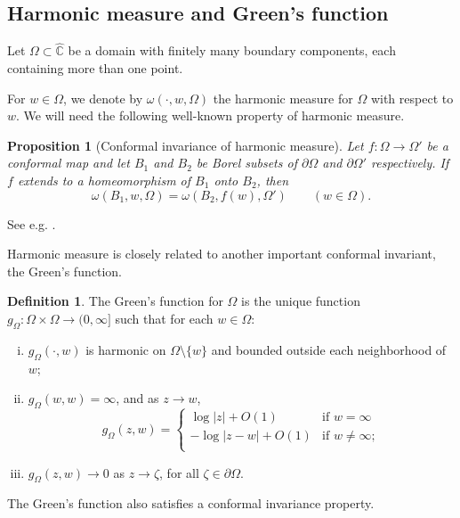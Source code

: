 \documentclass{amsart}
\theoremstyle{plain}
\newtheorem{proposition}[theorem]{Proposition}
\theoremstyle{definition}
\newtheorem{definition}[theorem]{Definition}
\theoremstyle{remark}
\newcommand{\hC}{\widehat{\mathbb{C}}}
\begin{document}
\subsection{Harmonic measure and Green's function}

Let $\Omega \subset \hC$ be a domain with finitely many boundary components, each containing more than one point.

For $w \in \Omega$, we denote by $\omega(\cdot,w,\Omega)$ the harmonic measure for $\Omega$ with respect to $w$. We will need the following well-known property of harmonic measure.

\begin{proposition}[Conformal invariance of harmonic measure]
Let $f:\Omega \to \Omega'$ be a conformal map and let $B_1$ and $B_2$ be Borel subsets of $\partial \Omega$ and $\partial \Omega'$ respectively. If $f$ extends to a homeomorphism of $ B_1$ onto $ B_2$, then
    $$\omega(B_1,w,\Omega) = \omega(B_2,f(w),\Omega') \qquad (w \in \Omega).$$
\end{proposition}
See e.g. \cite[Theorem 4.3.8]{Ransford1995}.

Harmonic measure is closely related to another important conformal invariant, the Green's function.

\begin{definition}
The Green's function for $\Omega$ is the unique function $g_\Omega:\Omega \times \Omega \to (0,\infty]$ such that for each $w \in \Omega$:

\begin{enumerate}[(i)]
\item $g_\Omega(\cdot,w)$ is harmonic on $\Omega \setminus \{w\}$ and bounded outside each neighborhood of $w$;
\item $g_\Omega(w,w)=\infty$, and as $z \to w$,
\begin{displaymath}
g_\Omega(z,w) = \left\{ \begin{array}{ll}
\log{|z|}+O(1) & \textrm{if $w=\infty $}\\
-\log{|z-w|}+O(1) & \textrm{if $w \neq \infty$};\\
\end{array} \right.
\end{displaymath}
\item $g_\Omega(z,w) \to 0$ as $z \to \zeta$, for all $\zeta \in \partial \Omega$.
\end{enumerate}
\end{definition}

The Green's function also satisfies a conformal invariance property.
\end{document}

